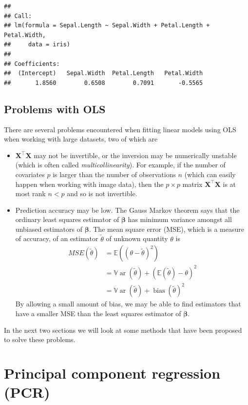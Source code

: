 \documentclass[
]{book}
\theoremstyle{definition}
\theoremstyle{definition}
\theoremstyle{definition}
\theoremstyle{definition}
\theoremstyle{remark}
\begin{document}
\begin{verbatim}
## 
## Call:
## lm(formula = Sepal.Length ~ Sepal.Width + Petal.Length + Petal.Width, 
##     data = iris)
## 
## Coefficients:
##  (Intercept)   Sepal.Width  Petal.Length   Petal.Width  
##       1.8560        0.6508        0.7091       -0.5565
\end{verbatim}

\hypertarget{problems-with-ols}{%
\subsection{Problems with OLS}\label{problems-with-ols}}

There are several problems encountered when fitting linear models using OLS when working with large datasets, two of which are

\begin{itemize}
\item
  \(\mathbf X^\top \mathbf X\) may not be invertible, or the inversion may be numerically unstable (which is often called \emph{multicollinearity}). For example, if the number of covariates \(p\) is larger than the number of observations \(n\) (which can easily happen when working with image data), then the \(p \times p\) matrix \(\mathbf X^\top \mathbf X\) is at most rank \(n<p\) and so is not invertible.
\item
  Prediction accuracy may be low. The Gauss Markov theorem says that the ordinary least squares estimator of \(\boldsymbol \beta\) has minimum variance amongst all unbiased estimators of \(\boldsymbol \beta\). The mean square error (MSE), which is a measure of accuracy, of an estimator \(\tilde{\theta}\) of unknown quantity \(\theta\) is
  \begin{align*}
  MSE(\tilde{\theta}) &= {\mathbb{E}}((\theta - \tilde{\theta})^2)\\
  &={\mathbb{V}\operatorname{ar}}(\tilde{\theta})+ ({\mathbb{E}}(\tilde{\theta})- \theta)^2\\
  &={\mathbb{V}\operatorname{ar}}(\tilde{\theta})+ \operatorname{bias}(\tilde{\theta})^2
  \end{align*}
  By allowing a small amount of bias, we may be able to find estimators that have a smaller MSE than the least squares estimator of \(\boldsymbol \beta\).
\end{itemize}

In the next two sections we will look at some methods that have been proposed to solve these problems.

\hypertarget{principal-component-regression-pcr}{%
\section{Principal component regression (PCR)}\label{principal-component-regression-pcr}}
\end{document}
